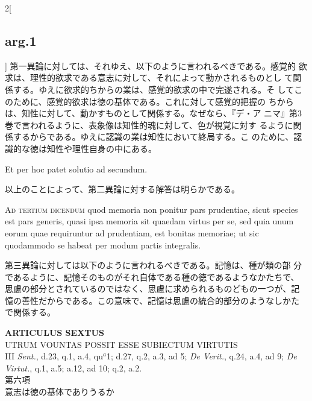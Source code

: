 \documentclass[paper=a4paper,fontsize=10pt,jafontsize=9pt,titlepage]{jlreq}
\begin{document}
\begin{paracol}{2}[\subsection{arg.1}]
第一異論に対しては、それゆえ、以下のように言われるべきである。感覚的
 欲求は、理性的欲求である意志に対して、それによって動かされるものとし
 て関係する。ゆえに欲求的ちからの業は、感覚的欲求の中で完遂される。そ
 してこのために、感覚的欲求は徳の基体である。これに対して感覚的把握の
 ちからは、知性に対して、動かすものとして関係する。なぜなら、『デ・ア
 ニマ』第3巻で言われるように、表象像は知性的魂に対して、色が視覚に対す
 るように関係するからである。ゆえに認識の業は知性において終局する。こ
 のために、認識的な徳は知性や理性自身の中にある。

\switchcolumn*[\subsection{ad.2}]

Et per hoc patet solutio ad secundum.

\switchcolumn

以上のことによって、第二異論に対する解答は明らかである。

\switchcolumn*[\subsection{ad.3}]

{\scshape Ad tertium dicendum} quod memoria non ponitur pars
prudentiae, sicut species est pars generis, quasi ipsa memoria sit
quaedam virtus per se, sed quia unum eorum quae requiruntur ad
prudentiam, est bonitas memoriae; ut sic quodammodo se habeat per
modum partis integralis.

\switchcolumn

第三異論に対しては以下のように言われるべきである。記憶は、種が類の部
分であるように、記憶そのものがそれ自体である種の徳であるようなかたちで、
思慮の部分とされているのではなく、思慮に求められるものどもの一つが、記
憶の善性だからである。この意味で、記憶は思慮の統合的部分のようなしかた
で関係する。

\end{paracol}
\newpage
{}
{}
\setcounter{section}{6}
\setcounter{subsection}{0}


\begin{center}
{\Large {\bfseries ARTICULUS SEXTUS}}\\
{\large UTRUM VOUNTAS POSSIT ESSE SUBIECTUM VIRTUTIS}\\
{\footnotesize III {\itshape Sent.}, d.23, q.1, a.4, qu$^{a}$1; d.27, q.2, a.3, ad 5; {\itshape De Verit.}, q.24, a.4, ad 9; {\itshape De Virtut.}, q.1, a.5; a.12, ad 10; q.2, a.2.}\\
{\Large 第六項\\意志は徳の基体でありうるか}
\end{center}
\end{document}
